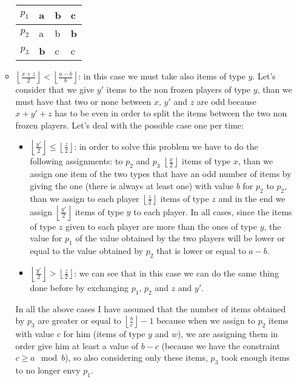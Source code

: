 \documentclass{article}
\newcommand{\floor}[3][2]{\left \lfloor\frac{#2}{#3}\right \rfloor}
\begin{document}
\begin{itemize}
\begin{itemize}
         \begin{table}[h]
            \centering
                \begin{tabular}{|l|l|l|l|}
                \hline
                $p_1$ & a               & \textbf{b}    & c             \\ \hline
                $p_2$ & a               & b             & \textbf{b}    \\ \hline
                $p_3$ & \textbf{b}      & c             & c             \\ \hline
                \end{tabular}
            \caption{}
            \label{table-3-players-aab-invert-w-lower-second-case-p3p1p2}
        \end{table}
        \item $\floor{x + z}{2} < \floor{a-b}{b}$: in this case we must take also items of type $y$. Let's consider that we give $y'$ items to the non frozen players of type $y$, than we must have that two or none between $x$, $y'$ and $z$ are odd because $x+y'+z$ has to be even in order to split the items between the two non frozen players. Let's deal with the possible case one per time:
        
        \begin{itemize}
            \item $\floor{y'}{2} \le \floor{z}{2}$: in order to solve this problem we have to do the following assignments: to $p_2$ and $p_3$ $\floor{x}{2}$ items of type $x$, than we assign one item of the two types that have an odd number of items by giving the one (there is always at least one) with value $b$ for $p_2$ to $p_2$, than we assign to each player $\floor{z}{2}$ items of type $z$ and in the end we assign $\floor{y'}{2}$ items of type $y$ to each player. In all cases, since the items of type $z$ given to each player are more than the ones of type $y$, the value for $p_1$ of the value obtained by the two players will be lower or equal to the value obtained by $p_2$ that is lower or equal to $a-b$.
            \item $\floor{y'}{2} > \floor{z}{2}$: we can see that in this case we can do the same thing done before by exchanging $p_1$, $p_2$ and $z$ and $y'$.
        \end{itemize}
        In all the above cases I have assumed that the number of items obtained by $p_3$ are greater or equal to $\floor{b}{c} -1$ because when we assign to $p_2$ items with value $c$ for him (items of type $y$ and $w$), we are assigning them in order give him at least a value of $b-c$ (because we have the constraint $c\ge a \mod b $), so also considering only these items, $p_3$ took enough items to no longer envy $p_1$.
    \end{itemize}
 
 \end{itemize}
\end{document}
